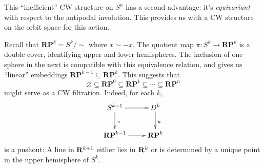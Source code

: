 This ``inefficient'' CW structure on $S^n$ has a second advantage: it's
{\em equivariant} with respect to the antipodal involution. This provides us
with a CW structure on the orbit space for this action. 

Recall that $\mathbf{RP}^k=S^k/\sim$ where $x\sim -x$. The quotient map
$\pi:S^k\to\mathbf{RP}^k$ is a double cover, identifying upper and lower 
hemispheres. The inclusion of one sphere in the next is compatible with
this equivalence relation, and gives us ``linear'' embeddings 
$\mathbf{RP}^{k-1}\subseteq\mathbf{RP}^k$. 
This suggests that
\[
\varnothing\subseteq\mathbf{RP}^0\subseteq\mathbf{RP}^1\subseteq\cdots
\subseteq\mathbf{RP}^n
\]
might serve as a CW filtration. Indeed, for each $k$,
\begin{equation*}
\xymatrix{
S^{k-1} \ar[r] \ar[d]^\pi & D^k \ar[d]^u \\
\mathbf{RP}^{k-1} \ar[r] & \mathbf{RP}^k 
}\end{equation*}
is a pushout: A line in $\mathbf R^{k+1}$ either lies in $\mathbf R^k$ or is determined 
by a unique point in the upper hemisphere of $S^k$.



